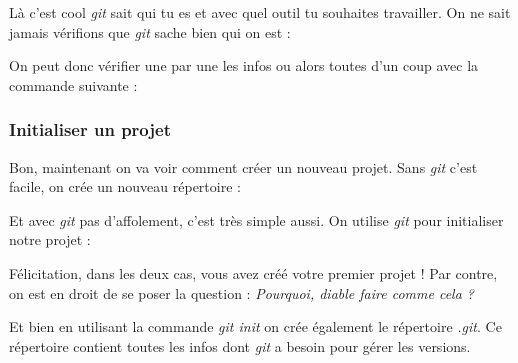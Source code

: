 \documentclass[12pt,a4paper]{article}
\begin{document}
{
}

Là c'est cool \emph{git} sait qui tu es et avec quel outil tu souhaites travailler. On ne sait jamais vérifions que \emph{git} sache bien qui on est :

{
}

On peut donc vérifier une par une les infos ou alors toutes d'un coup avec la commande suivante :

{
}

\subsubsection{Initialiser un projet}

Bon, maintenant on va voir comment créer un nouveau projet. Sans \emph{git} c'est facile, on crée un nouveau répertoire :

{
}

Et avec \emph{git} pas d'affolement, c'est très simple aussi. On utilise \emph{git} pour initialiser notre projet :

{
}

Félicitation, dans les deux cas, vous avez créé votre premier projet ! Par contre, on est en droit de se poser la question : \emph{Pourquoi, diable faire comme cela ?}

Et bien en utilisant la commande \emph{git init} on crée également le répertoire \emph{.git}. Ce répertoire contient toutes les infos dont \emph{git} a besoin pour gérer les versions.
\end{document}
